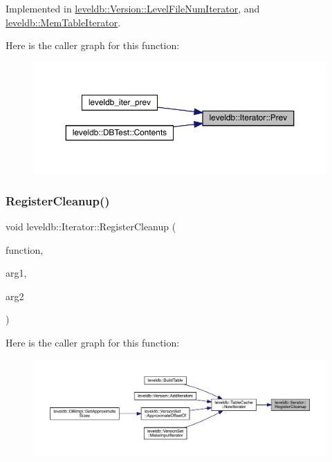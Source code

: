 Implemented in \mbox{\hyperlink{classleveldb_1_1_version_1_1_level_file_num_iterator_ab39c60a98d579590231034fdb665cb42}{leveldb\+::\+Version\+::\+Level\+File\+Num\+Iterator}}, and \mbox{\hyperlink{classleveldb_1_1_mem_table_iterator_a61f8a385b268158a1e7bd0cba29a83c1}{leveldb\+::\+Mem\+Table\+Iterator}}.

Here is the caller graph for this function\+:
\nopagebreak
\begin{figure}[H]
\begin{center}
\leavevmode
\includegraphics[width=350pt]{classleveldb_1_1_iterator_a28798d802a203788587dc6adc5bc729e_icgraph}
\end{center}
\end{figure}
\mbox{\label{classleveldb_1_1_iterator_a8c0281f9e4a2c9dceb37aad8128b636f}} 
\subsubsection{\texorpdfstring{RegisterCleanup()}{RegisterCleanup()}}
{\footnotesize\ttfamily void leveldb\+::\+Iterator\+::\+Register\+Cleanup (\begin{DoxyParamCaption}\item[{\mbox{\hyperlink{classleveldb_1_1_iterator_aefcc7b475ddca596fe2429a2976e7730}{Cleanup\+Function}}}]{function,  }\item[{void $\ast$}]{arg1,  }\item[{void $\ast$}]{arg2 }\end{DoxyParamCaption})}

Here is the caller graph for this function\+:
\nopagebreak
\begin{figure}[H]
\begin{center}
\leavevmode
\includegraphics[width=350pt]{classleveldb_1_1_iterator_a8c0281f9e4a2c9dceb37aad8128b636f_icgraph}
\end{center}
\end{figure}
\mbox{\label{classleveldb_1_1_iterator_a97a556e97ded60c677fbf4de7321ec44}} 
